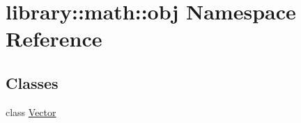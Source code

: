 \hypertarget{namespacelibrary_1_1math_1_1obj}{}\section{library\+:\+:math\+:\+:obj Namespace Reference}
\label{namespacelibrary_1_1math_1_1obj}
\subsection*{Classes}
\begin{DoxyCompactItemize}
\item 
class \hyperlink{classlibrary_1_1math_1_1obj_1_1_vector}{Vector}
\end{DoxyCompactItemize}
